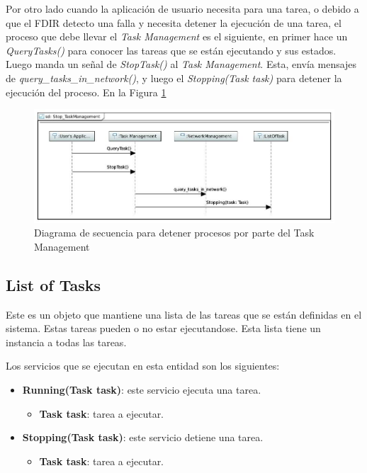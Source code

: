 Por otro lado cuando la aplicación de usuario necesita para una tarea, o debido
a que el FDIR detecto una falla y necesita detener la ejecución de una tarea, el
proceso que debe llevar el \textit{Task Management} es el siguiente, en primer
hace un \textit{QueryTasks()} para conocer las tareas que se están ejecutando y
sus estados. Luego manda un señal de \textit{StopTask()} al \textit{Task
  Management}. Esta, envía mensajes de \textit{query\_tasks\_in\_network()},
y luego el \textit{Stopping(Task task)} para detener la ejecución del proceso.
En la Figura \ref{fig:TaskManagement_StopTask}

\begin{figure}[h!]
 \centering
 \includegraphics[scale=0.4]{images/Secciones/AppendixA/Stop_TaskManagement.JPG}
 \caption{Diagrama de secuencia para detener procesos por parte del
   Task Management}
\label{fig:TaskManagement_StopTask}
\end{figure}

\subsection{List of Tasks}\label{subsection:listoftask}
Este es un objeto que mantiene una lista de las tareas que se están definidas en
el sistema. Estas tareas pueden o no estar ejecutandose. Esta lista tiene un
instancia a todas las tareas. 

Los servicios que se ejecutan en esta entidad son los siguientes:
\begin{itemize}
\item \textbf{Running(Task task)}: este servicio ejecuta una tarea.
  \begin{itemize}
    \item \textbf{Task task}: tarea a ejecutar.
  \end{itemize}  
\item \textbf{Stopping(Task task)}: este servicio detiene una tarea.
  \begin{itemize}
    \item \textbf{Task task}: tarea a ejecutar.
  \end{itemize}
\end{itemize}

